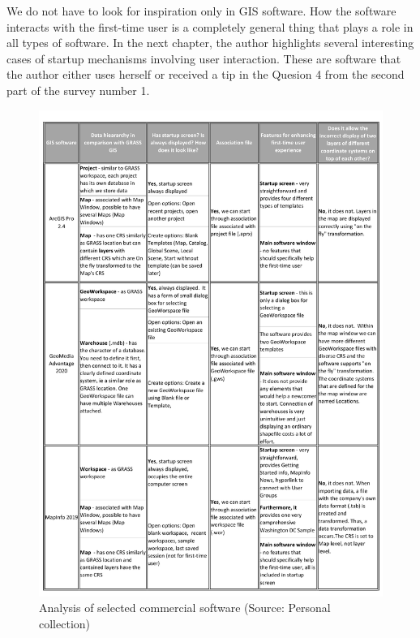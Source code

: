 \documentclass[a4paper,10pt,twoside]{article}
\begin{document}
We do not have to look for inspiration only in GIS software. How the software interacts with the first-time user is a completely general thing that plays a role in all types of software. In the next chapter, the author highlights several interesting cases of startup mechanisms involving user interaction. These are software that the author either uses herself or received a tip in the Quesion 4 from the second part of the survey number 1.

\vspace{0.3cm}
\begin{figure}[hbt!] 
\begin{center}
\includegraphics[width=15cm]{../pictures/commercial_software.pdf}
\caption[Analysis of selected commercial software]{Analysis of selected commercial software (Source: Personal collection)}
\label{fig:commercial_software}
\end{center}
\end{figure}
\end{document}
